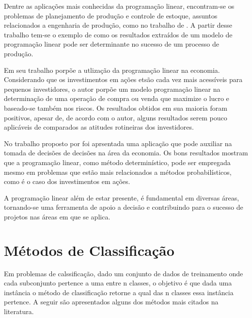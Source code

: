 Dentre as aplicações mais conhecidas da programação linear, encontram-se os problemas de planejamento de produção e controle de estoque, assuntos relacionados a engenharia de produção, como no trabalho de . A partir desse trabalho tem-se o exemplo de como os resultados extraídos de um modelo de programação linear pode ser determinante no sucesso de um processo de produção.

Em seu trabalho  porpõe a utlização da programação linear na economia. Considerando que os investimentos em ações etsão cada vez mais acessíveis para pequenos investidores, o autor porpõe um modelo programação linear na determinação de uma operação de compra ou venda que maximize o lucro e baseado-se também nos riscos. Os resultados obtidos em sua maioria foram positivos, apesar de, de acordo com o autor, alguns resultados serem pouco aplicáveis de comparados as atitudes rotineiras dos investidores.

No trabalho proposto por \cite{Krukoski2010Economia} foi aprsentada uma aplicação que pode auxiliar na tomada de decisões de decisões na área da economia. Os bons resultados mostram que a programação linear, como método determinístico, pode ser empregada mesmo em problemas que estão mais relacionados a métodos probabilísticos, como é o caso dos investimentos em ações.

A programação linear além de estar presente, é fundamental em diversas áreas, tornando-se uma ferramenta de apoio a decisão e contribuindo para o sucesso de projetos nas áreas em que se aplica.

\section{Métodos de Classificação}
Em problemas de calssificação, dado um conjunto de dados de treinamento onde cada subconjunto pertence a uma entre n classes, o objetivo é que dada uma instância o método de classificação retorne a qual das n classes essa instância pertence. A seguir são apresentados alguns dos métodos mais citados na literatura. 

